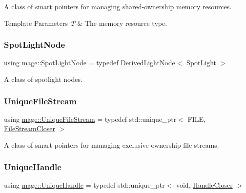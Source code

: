 A class of smart pointers for managing shared-\/ownership memory resources.


\begin{DoxyTemplParams}{Template Parameters}
{\em T} & The memory resource type. \\
\hline
\end{DoxyTemplParams}
\hypertarget{namespacemage_aeed5dee4ff6c591eabb0e9114256df4a}{}\label{namespacemage_aeed5dee4ff6c591eabb0e9114256df4a} 
\subsubsection{\texorpdfstring{Spot\+Light\+Node}{SpotLightNode}}
{\footnotesize\ttfamily using \hyperlink{namespacemage_aeed5dee4ff6c591eabb0e9114256df4a}{mage\+::\+Spot\+Light\+Node} = typedef \hyperlink{classmage_1_1_derived_light_node}{Derived\+Light\+Node}$<$ \hyperlink{classmage_1_1_spot_light}{Spot\+Light} $>$}

A class of spotlight nodes. \hypertarget{namespacemage_a4250d57cb76846bd81137e496ca41148}{}\label{namespacemage_a4250d57cb76846bd81137e496ca41148} 
\subsubsection{\texorpdfstring{Unique\+File\+Stream}{UniqueFileStream}}
{\footnotesize\ttfamily using \hyperlink{namespacemage_a4250d57cb76846bd81137e496ca41148}{mage\+::\+Unique\+File\+Stream} = typedef std\+::unique\+\_\+ptr$<$ F\+I\+LE, \hyperlink{structmage_1_1_file_stream_closer}{File\+Stream\+Closer} $>$}

A class of smart pointers for managing exclusive-\/ownership file streams. \hypertarget{namespacemage_a71b57b9dc2b47346aac2d355fb98a3d2}{}\label{namespacemage_a71b57b9dc2b47346aac2d355fb98a3d2} 
\subsubsection{\texorpdfstring{Unique\+Handle}{UniqueHandle}}
{\footnotesize\ttfamily using \hyperlink{namespacemage_a71b57b9dc2b47346aac2d355fb98a3d2}{mage\+::\+Unique\+Handle} = typedef std\+::unique\+\_\+ptr$<$ void, \hyperlink{structmage_1_1_handle_closer}{Handle\+Closer} $>$}

